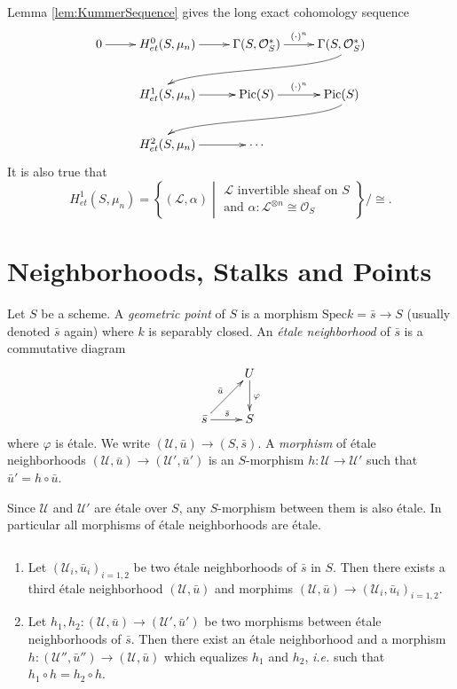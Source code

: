 \noindent
Lemma \ref{lem:KummerSequence} gives the long exact cohomology sequence
$$
\xymatrix{
0  \ar[r] & H_{et}^0(S, \mu_n) \ar[r] & \Gamma(S, \mathcal{O}_S^*) 
\ar^{(\cdot)^n}[r] & \Gamma(S, \mathcal{O}_S^*) 
\ar@(rd,ul)[rdllllr]
\\ 
& H_{et}^1(S, \mu_n) \ar[r] & \text{Pic}(S) \ar^{(\cdot)^n}[r] & \text{Pic} (S) 
\ar@(rd,ul)[rdllllr] \\
& H_{et}^2(S, \mu_n) \ar[r] & \cdots 
}
$$
It is also true that
$$
H_{et}^1(S, \mu_n) = \left\{(\mathcal{L}, \alpha)\; 
\left| \; 
\begin{matrix}
\mathcal{L}\text{ invertible sheaf on } S  \\
\text{and }\alpha: \mathcal{L}^{\otimes n} \cong \mathcal{O}_S
\end{matrix}
\right.
\right\}
\Big/\cong.
$$

\section{Neighborhoods, Stalks and Points}
\label{section-stalks}

\begin{definition}
Let $S$ be a scheme. A {\it geometric point} of $S$ is a morphism $\text{Spec} 
k = \bar s \to S$ (usually denoted $\bar s$ again)  where $k$ is separably 
closed. An {\it \'etale neighborhood} of $\bar s$ is a commutative diagram
$$
\xymatrix{
& U \ar^{\varphi}[d] \\
{\bar s} \ar^{\bar s}[r] \ar^{\bar u}[ur] & S 
}
$$
where $\varphi$ is \'etale. We write $(\mathcal{U}, \bar u)\to (S, \bar s)$. A 
{\it morphism} of \'etale neighborhoods $(\mathcal{U}, \bar u)\to 
(\mathcal{U}',\bar u')$ is an $S$-morphism $h: \mathcal{U}\to \mathcal{U}'$ 
such that $\bar u'=h\circ\bar u$. 
\end{definition}

\begin{remark}
Since $\mathcal{U}$ and $\mathcal{U}'$ are \'etale over $S$, any $S$-morphism 
between them is also \'etale. In particular all morphisms of \'etale 
neighborhoods are \'etale.
\end{remark}

\begin{lemma} $ $ \label{lem:CofinalityOfEtaleNbhds}
\begin{enumerate}
\item Let $(\mathcal{U}_i, \bar u_i)_{i=1, 2}$ be two \'etale neighborhoods of 
$\bar s$ in $S$. Then there exists a third \'etale neighborhood $(\mathcal{U}, 
\bar u)$ and morphims $(\mathcal{U}, \bar u) \to (\mathcal{U}_i, \bar 
u_i)_{i=1,2}$.
\item Let $h_1, h_2: (\mathcal{U}, \bar u) \to (\mathcal{U}', \bar u')$ be two 
morphisms between \'etale neighborhoods of $\bar s$. Then there exist an 
\'etale neighborhood and a morphism $h : (\mathcal{U}'', \bar u'')\to 
(\mathcal{U}, \bar u)$ which equalizes $h_1$ and $h_2$, {\it i.e.}  such that 
$h_1\circ h = h_2\circ h$.		
\end{enumerate}
\end{lemma}

